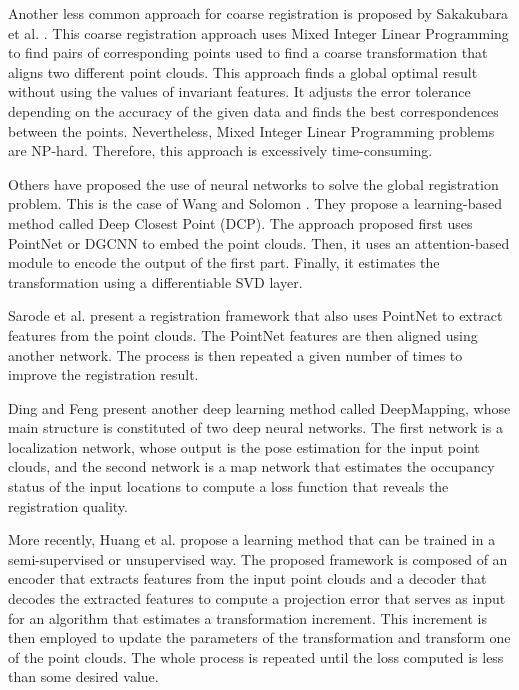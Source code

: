         Another less common approach for coarse registration is proposed by Sakakubara et al. \cite{Sakakubara_2007_automatic}.
        This coarse registration approach uses Mixed Integer Linear Programming to find pairs of corresponding points %
        used to find a coarse transformation that aligns two different point clouds.
        This approach finds a global optimal result without using the values of invariant features.
        It adjusts the error tolerance depending on the accuracy of the given data and 
        finds the best correspondences between the points.
        Nevertheless, Mixed Integer Linear Programming problems are NP-hard. Therefore, this approach is excessively time-consuming.

        Others have proposed the use of neural networks to solve the global registration problem.
        This is the case of Wang and Solomon \cite{Wang_2019_deepclosest}. They propose a learning-based method called Deep Closest Point (DCP).
        The approach proposed first uses PointNet \cite{Qi_2017_pointnetdeep} or DGCNN \cite{Wang_2019_dynamic} to embed the point clouds.
        Then, it uses an attention-based module to encode the output of the first part.
        Finally, it estimates the transformation using a differentiable SVD layer.

        Sarode et al. \cite{Sarode_2019_oneframework} present a registration framework that also uses PointNet to extract features from the point clouds.
        The PointNet features are then aligned using another network. The process is then repeated a given number of times to improve the registration result.
        
        Ding and Feng \cite{Ding_2019_deepmapping} present another deep learning method called DeepMapping,
        whose main structure is constituted of two deep neural networks.
        The first network is a localization network, whose output is the pose estimation for the input point clouds,
        and the second network is a map network that estimates the occupancy status of the input locations to compute a loss function that reveals
        the registration quality.

        More recently, Huang et al. \cite{Huang_2020_feature} propose a learning method that can be trained in a semi-supervised or unsupervised way.
        The proposed framework is composed of an encoder that extracts features from the input point clouds
        and a decoder that decodes the extracted features to compute a projection error that serves as input for an algorithm that estimates
        a transformation increment. 
        This increment is then employed to update the parameters of the transformation and transform one of the point clouds.
        The whole process is repeated until the loss computed is less than some desired value.

